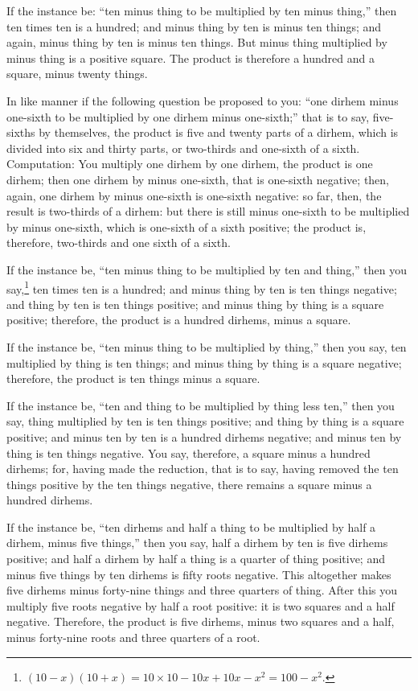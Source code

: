 If the instance be: ``ten minus thing to be multiplied by ten minus thing,'' then ten times ten is a hundred; and minus thing by ten is minus ten things; and again, minus thing by ten is minus ten things. But minus thing multiplied by minus thing is a positive square. The product is therefore a hundred and a square, minus twenty things.

In like manner if the following question be proposed to you: ``one dirhem minus one-sixth to be multiplied by one dirhem minus one-sixth;'' that is to say, five-sixths by themselves, the product is five and twenty parts of a dirhem, which is divided into six and thirty parts, or two-thirds and one-sixth of a sixth. Computation: You multiply one dirhem by one dirhem, the product is one dirhem; then one dirhem by minus one-sixth, that is one-sixth negative; then, again, one dirhem by minus one-sixth is one-sixth negative: so far, then, the result is two-thirds of a dirhem: but there is still minus one-sixth to be multiplied by minus one-sixth, which is one-sixth of a sixth positive; the product is, therefore, two-thirds and one sixth of a sixth.

If the instance be, ``ten minus thing to be multiplied by ten and thing,'' then you say,\footnote{$(10 - x)(10 + x) = 10 \times 10 - 10x + 10x - x^2 = 100 - x^2$.} ten times ten is a hundred; and minus thing by ten is ten things negative; and thing by ten is ten things positive; and minus thing by thing is a square positive; therefore, the product is a hundred dirhems, minus a square.

If the instance be, ``ten minus thing to be multiplied by thing,'' then you say, ten multiplied by thing is ten things; and minus thing by thing is a square negative; therefore, the product is ten things minus a square.

If the instance be, ``ten and thing to be multiplied by thing less ten,'' then you say, thing multiplied by ten is ten things positive; and thing by thing is a square positive; and minus ten by ten is a hundred dirhems negative; and minus ten by thing is ten things negative. You say, therefore, a square minus a hundred dirhems; for, having made the reduction, that is to say, having removed the ten things positive by the ten things negative, there remains a square minus a hundred dirhems.

If the instance be, ``ten dirhems and half a thing to be multiplied by half a dirhem, minus five things,'' then you say, half a dirhem by ten is five dirhems positive; and half a dirhem by half a thing is a quarter of thing positive; and minus five things by ten dirhems is fifty roots negative. This altogether makes five dirhems minus forty-nine things and three quarters of thing. After this you multiply five roots negative by half a root positive: it is two squares and a half negative. Therefore, the product is five dirhems, minus two squares and a half, minus forty-nine roots and three quarters of a root.

